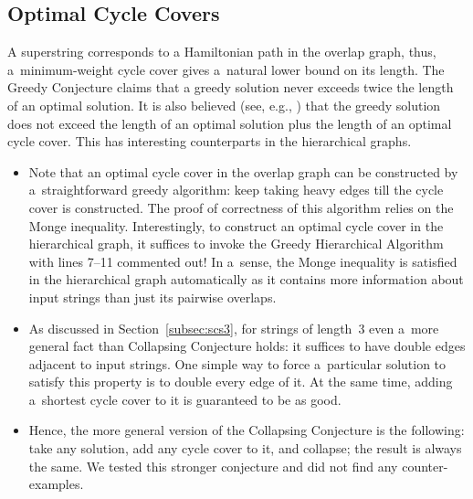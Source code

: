 \subsection{Optimal Cycle Covers}
A superstring corresponds to a Hamiltonian path in the overlap graph, thus, a~minimum-weight cycle cover gives a~natural lower bound on its length. 
The Greedy Conjecture claims that a greedy solution never exceeds twice the length of an optimal solution. It is also  believed (see, e.g., \cite{weinard2006greedy,laube2005conditional}) that the greedy solution does not exceed the length of an optimal solution plus the length of an optimal cycle cover. 
%
This has interesting counterparts in the hierarchical graphs. 
\begin{itemize}
\item Note that an optimal cycle cover in the overlap graph can be constructed by a~straightforward greedy algorithm: keep taking heavy edges till the cycle cover is constructed. The proof of correctness of this algorithm relies on the Monge inequality. Interestingly, to construct an optimal cycle cover in the hierarchical graph, it suffices to invoke the Greedy Hierarchical Algorithm with lines 7--11 commented out! In a~sense, the Monge inequality is satisfied in the hierarchical graph automatically as it contains more information about input strings than just its pairwise overlaps. \item As discussed in Section~\ref{subsec:scs3}, for strings of length~3 even a~more general fact than Collapsing Conjecture holds: it suffices to have double edges adjacent to input strings. One simple way to force a~particular solution to satisfy this property is to double every edge of it. At the same time, adding a~shortest cycle cover to it is guaranteed to be as good.
\item Hence, the more general version of the Collapsing Conjecture is the following: take any solution, add any cycle cover to it, and collapse; the result is always the same. We tested this stronger conjecture and did not find any counter-examples.
\end{itemize}

%

